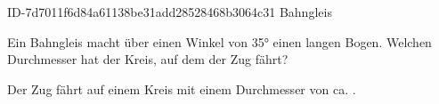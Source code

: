 \begin{exercise}
      {ID-7d7011f6d84a61138be31add28528468b3064c31}
      {Bahngleis}
  \ifproblem\problem\par
    Ein Bahngleis macht über einen Winkel von \ang{35} einen 
    langen Bogen. Welchen Durchmesser hat der Kreis, auf dem der Zug fährt?
  \fi
  \ifoutcome\outcome\par
    Der Zug fährt auf einem Kreis mit einem Durchmesser von
    ca. .
  \fi
\end{exercise}
